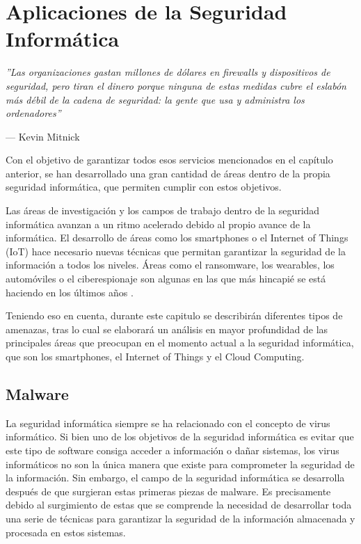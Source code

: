 \chapter[Aplicaciones]{Aplicaciones de la Seguridad Informática}

\epigraph{\textit{''Las organizaciones gastan millones de dólares en firewalls y dispositivos de seguridad, pero tiran el dinero porque ninguna de estas medidas cubre el eslabón más débil de la cadena de seguridad: la gente que usa y administra los ordenadores''}}{--- Kevin Mitnick}

Con el objetivo de garantizar todos esos servicios mencionados en el capítulo anterior, se han desarrollado una gran cantidad de áreas dentro de la propia seguridad informática, que permiten cumplir con estos objetivos.

Las áreas de investigación y los campos de trabajo dentro de la seguridad informática avanzan a un ritmo acelerado debido al propio avance de la informática. El desarrollo de áreas como los smartphones o el Internet of Things (IoT) hace necesario nuevas técnicas que permitan garantizar la seguridad de la información a todos los niveles. Áreas como el ransomware, los wearables, los automóviles o el ciberespionaje son algunas en las que más hincapié se está haciendo en los últimos años \cite{mcafee-predictions}.

Teniendo eso en cuenta, durante este capitulo se describirán diferentes tipos de amenazas, tras lo cual se elaborará un análisis en mayor profundidad de las principales áreas que preocupan en el momento actual a la seguridad informática, que son los smartphones, el Internet of Things y el Cloud Computing.


\section{Malware}

La seguridad informática siempre se ha relacionado con el concepto de virus informático. Si bien uno de los objetivos de la seguridad informática es evitar que este tipo de software consiga acceder a información o dañar sistemas, los virus informáticos no son la única manera que existe para comprometer la seguridad de la información. Sin embargo, el campo de la seguridad informática se desarrolla después de que surgieran estas primeras piezas de malware. Es precisamente debido al surgimiento de estas que se comprende la necesidad de desarrollar toda una serie de técnicas para garantizar la seguridad de la información almacenada y procesada en estos sistemas.


